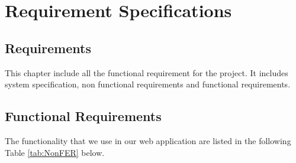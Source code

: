 \doublespacing
\chapter{Requirement Specifications} \label{chap:reqs}


\section{Requirements}
This chapter include all the functional requirement for the project. It includes system specification, non functional requirements and functional requirements.

\section{Functional Requirements}
The functionality that we use in our web application are listed in the following Table \ref{tab:NonFER} below.


